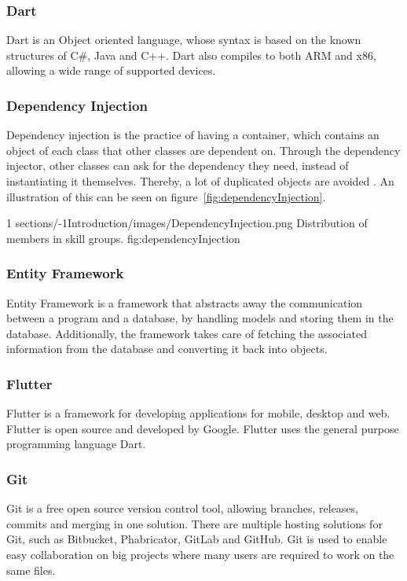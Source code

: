 \subsubsection{Dart} 
Dart is an Object oriented language, whose syntax is based on the known structures of C\#, Java and C++. Dart also compiles to both ARM and x86, allowing a wide range of supported devices. \citep{cite:DartLang}

\subsubsection{Dependency Injection}
Dependency injection is the practice of having a container, which contains an object of each class that other classes are dependent on. Through the dependency injector, other classes can ask for the dependency they need, instead of instantiating it themselves. Thereby, a lot of duplicated objects are avoided \citep{cite:dependencyInjection}.
An illustration of this can be seen on figure~\ref{fig:dependencyInjection}.

        {1} %
        {sections/-1Introduction/images/DependencyInjection.png} %
        {Distribution of members in skill groups.} %
        {fig:dependencyInjection} %

\subsubsection{Entity Framework}
\label{section:entityFramework}
Entity Framework is a framework that abstracts away the communication between a program and a database, by handling models and storing them in the database. Additionally, the framework takes care of fetching the associated information from the database and converting it back into objects. \citep{cite:entityFramework}

\subsubsection{Flutter}
Flutter is a framework for developing applications for mobile, desktop and web. Flutter is open source and developed by Google. Flutter uses the general purpose programming language Dart. \citep{cite:flutter}

\subsubsection{Git}
Git is a free open source version control tool, allowing branches, releases, commits and merging in one solution. There are multiple hosting solutions for Git, such as Bitbucket, Phabricator, GitLab and GitHub. Git is used to enable easy collaboration on big projects where many users are required to work on the same files. 
\citep{cite:Git}

